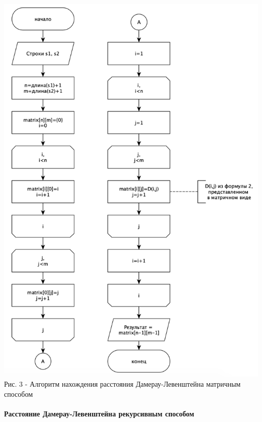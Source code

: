 \documentclass[a4paper,14pt]{article} %
\begin{document}
        \begin{center}
        		\includegraphics[scale = 0.8]{shema2} \\ Рис. 3 - Алгоритм нахождения расстояния Дамерау-Левенштейна матричным способом
	\end{center}
	
	\paragraph{Расстояние Дамерау-Левенштейна рекурсивным способом}
	
\end{document}
